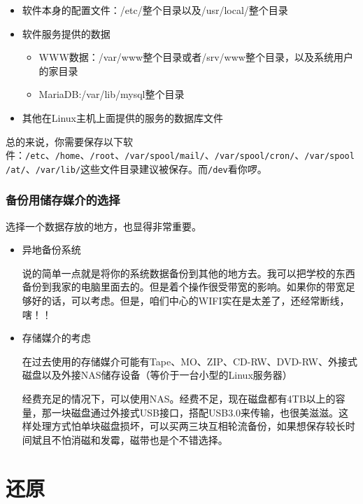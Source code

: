 \documentclass[
]{book}
\providecommand{\tightlist}{%
  \setlength{\itemsep}{0pt}\setlength{\parskip}{0pt}}
\begin{document}
\begin{itemize}
\tightlist
\item
  软件本身的配置文件：/etc/整个目录以及/usr/local/整个目录
\item
  软件服务提供的数据

  \begin{itemize}
  \tightlist
  \item
    WWW数据：/var/www整个目录或者/srv/www整个目录，以及系统用户的家目录
  \item
    MariaDB:/var/lib/mysql整个目录
  \end{itemize}
\item
  其他在Linux主机上面提供的服务的数据库文件
\end{itemize}

总的来说，你需要保存以下软件：\texttt{/etc}、\texttt{/home}、\texttt{/root}、\texttt{/var/spool/mail/}、\texttt{/var/spool/cron/}、\texttt{/var/spool/at/}、\texttt{/var/lib/}这些文件目录建议被保存。而\texttt{/dev}看你啰。

\hypertarget{ux5907ux4efdux7528ux50a8ux5b58ux5a92ux4ecbux7684ux9009ux62e9}{%
\subsection{备份用储存媒介的选择}\label{ux5907ux4efdux7528ux50a8ux5b58ux5a92ux4ecbux7684ux9009ux62e9}}

选择一个数据存放的地方，也显得非常重要。

\begin{itemize}
\item
  异地备份系统

  说的简单一点就是将你的系统数据备份到其他的地方去。我可以把学校的东西备份到我家的电脑里面去的。但是着个操作很受带宽的影响。如果你的带宽足够好的话，可以考虑。但是，咱们中心的WIFI实在是太差了，还经常断线，嗐！！
\item
  存储媒介的考虑

  在过去使用的存储媒介可能有Tape、MO、ZIP、CD-RW、DVD-RW、外接式磁盘以及外接NAS储存设备（等价于一台小型的Linux服务器）

  经费充足的情况下，可以使用NAS。经费不足，现在磁盘都有4TB以上的容量，那一块磁盘通过外接式USB接口，搭配USB3.0来传输，也很美滋滋。这样处理方式怕单块磁盘损坏，可以买两三块互相轮流备份，如果想保存较长时间斌且不怕消磁和发霉，磁带也是个不错选择。
\end{itemize}

\hypertarget{ux8fd8ux539f}{%
\chapter{还原}\label{ux8fd8ux539f}}
\end{document}
